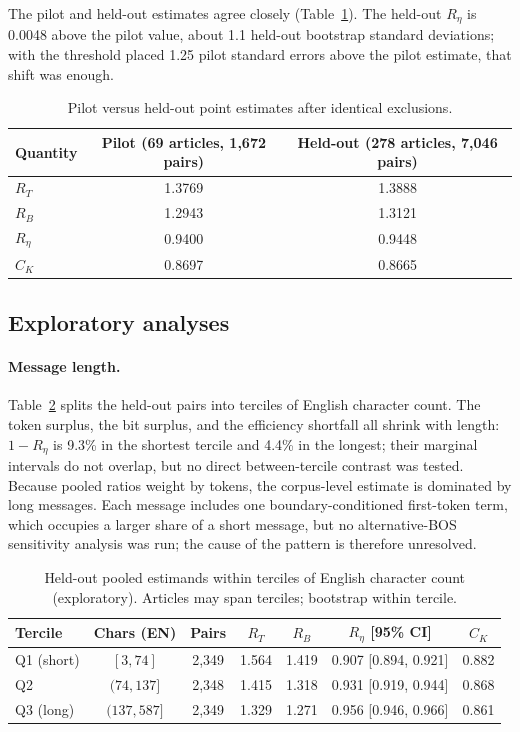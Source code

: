 \documentclass[11pt,a4paper]{article}
\newcommand{\RT}{R_{T}}
\newcommand{\RB}{R_{B}}
\newcommand{\Reta}{R_{\eta}}
\newcommand{\CK}{C_{K}}
\begin{document}
The pilot and held-out estimates agree closely (Table~\ref{tab:pilot}). The
held-out $\Reta$ is 0.0048 above the pilot value, about 1.1 held-out
bootstrap standard deviations; with the threshold placed 1.25
pilot standard errors above the pilot estimate, that shift was enough.

\begin{table}[htbp]
\centering\small
\caption{Pilot versus held-out point estimates after identical exclusions.}
\label{tab:pilot}
\begin{tabular}{@{}lcc@{}}
\toprule
Quantity & Pilot (69 articles, 1{,}672 pairs) & Held-out (278 articles, 7{,}046 pairs) \\
\midrule
$\RT$   & 1.3769 & 1.3888 \\
$\RB$   & 1.2943 & 1.3121 \\
$\Reta$ & 0.9400 & 0.9448 \\
$\CK$   & 0.8697 & 0.8665 \\
\bottomrule
\end{tabular}
\end{table}

\subsection{Exploratory analyses}

\paragraph{Message length.} Table~\ref{tab:length} splits the held-out pairs
into terciles of English character count. The token surplus, the bit
surplus, and the efficiency shortfall all shrink with length: $1-\Reta$ is
9.3\% in the shortest tercile and 4.4\% in the longest; their marginal
intervals do not overlap, but no direct between-tercile contrast was tested.
Because pooled ratios weight by tokens, the corpus-level estimate is
dominated by long messages. Each message includes one boundary-conditioned
first-token term, which occupies a larger share of a short message, but no
alternative-BOS sensitivity analysis was run; the cause of the pattern is
therefore unresolved.

\begin{table}[htbp]
\centering\small
\caption{Held-out pooled estimands within terciles of English character
count (exploratory). Articles may span terciles; bootstrap within tercile.}
\label{tab:length}
\begin{tabular}{@{}lcccccc@{}}
\toprule
Tercile & Chars (EN) & Pairs & $\RT$ & $\RB$ & $\Reta$ [95\% CI] & $\CK$ \\
\midrule
Q1 (short) & $[3,74]$    & 2{,}349 & 1.564 & 1.419 & 0.907 [0.894, 0.921] & 0.882 \\
Q2         & $(74,137]$  & 2{,}348 & 1.415 & 1.318 & 0.931 [0.919, 0.944] & 0.868 \\
Q3 (long)  & $(137,587]$ & 2{,}349 & 1.329 & 1.271 & 0.956 [0.946, 0.966] & 0.861 \\
\bottomrule
\end{tabular}
\end{table}
\end{document}
